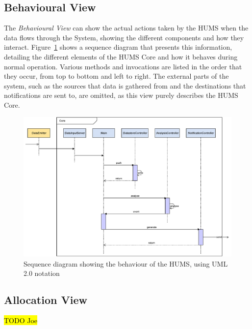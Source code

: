 \documentclass[10pt,a4paper]{article}
\begin{document}
\subsection{Behavioural View}

The \emph{Behavioural View} can show the actual actions taken by the HUMS when the data flows through the System, showing the different components and how they interact. Figure~\ref{fig:sequence} shows a sequence diagram that presents this information, detailing the different elements of the HUMS Core and how it behaves during normal operation. Various methods and invocations are listed in the order that they occur, from top to bottom and left to right. The external parts of the system, such as the sources that data is gathered from and the destinations that notifications are sent to, are omitted, as this view purely describes the HUMS Core.

\begin{figure}[h]
  \centering
  \includegraphics[width=\textwidth]{images/behaviourView.pdf}
  \caption{Sequence diagram showing the behaviour of the HUMS, using UML 2.0 notation}
  \label{fig:sequence}
\end{figure}


\subsection{Allocation View}
\hl{TODO Joe}
\end{document}
